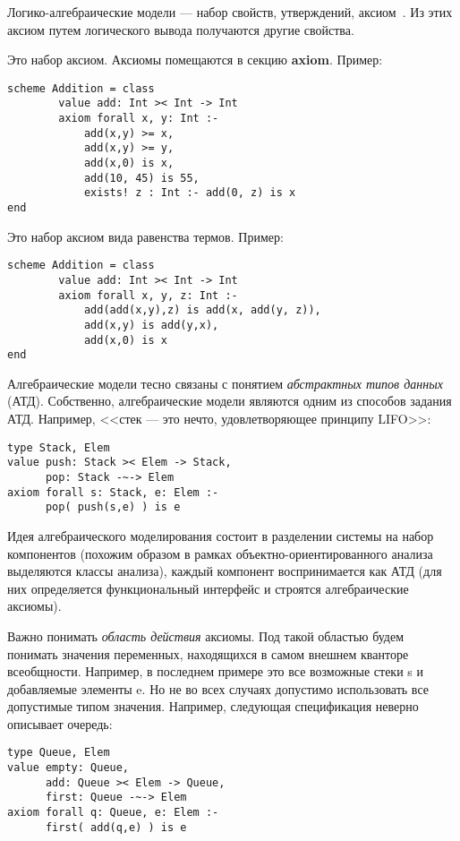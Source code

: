 Логико-алгебраические модели --- набор свойств, утверждений, аксиом~\cite{kuliamin}. Из этих аксиом путем логического вывода получаются другие свойства.

Это набор аксиом. Аксиомы помещаются в секцию \textbf{axiom}. Пример:
\begin{lstlisting}
scheme Addition = class
        value add: Int >< Int -> Int
        axiom forall x, y: Int :-
            add(x,y) >= x,
            add(x,y) >= y,
            add(x,0) is x,
            add(10, 45) is 55,
            exists! z : Int :- add(0, z) is x
end
\end{lstlisting}

Это набор аксиом вида равенства термов. Пример:
\begin{lstlisting}
scheme Addition = class
        value add: Int >< Int -> Int
        axiom forall x, y, z: Int :-
            add(add(x,y),z) is add(x, add(y, z)),
            add(x,y) is add(y,x),
            add(x,0) is x
end
\end{lstlisting}

Алгебраические модели тесно связаны с понятием \emph{абстрактных типов данных} (АТД). Собственно, алгебраические модели являются одним из способов задания АТД. Например, <<стек --- это нечто, удовлетворяющее принципу LIFO>>:
\begin{lstlisting}
type Stack, Elem
value push: Stack >< Elem -> Stack,
      pop: Stack -~-> Elem
axiom forall s: Stack, e: Elem :-
      pop( push(s,e) ) is e
\end{lstlisting}

Идея алгебраического моделирования состоит в разделении системы на набор компонентов (похожим образом в рамках объектно-ориентированного анализа выделяются классы анализа), каждый компонент воспринимается как АТД (для них определяется функциональный интерфейс и строятся алгебраические аксиомы).


Важно понимать \emph{область действия} аксиомы. Под такой областью будем понимать значения переменных, находящихся в самом внешнем кванторе всеобщности. Например, в последнем примере это все возможные стеки s и добавляемые элементы e. Но не во всех случаях допустимо использовать все допустимые типом значения. Например, следующая спецификация неверно описывает очередь:
\begin{lstlisting}
type Queue, Elem
value empty: Queue,
      add: Queue >< Elem -> Queue,
      first: Queue -~-> Elem
axiom forall q: Queue, e: Elem :-
      first( add(q,e) ) is e
\end{lstlisting}

